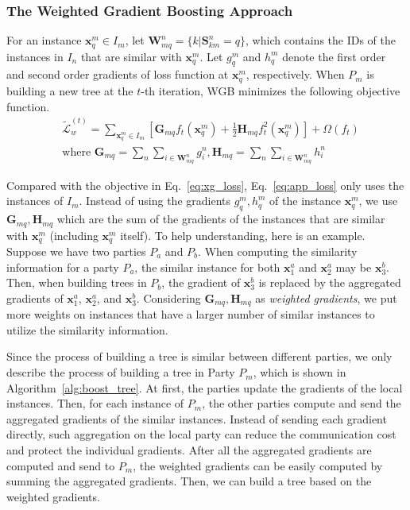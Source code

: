 \documentclass[letterpaper]{article} %
\theoremstyle{definition}
\newcommand{\mtx}[1]{\ensuremath{\mathbf{#1}}}
\begin{document}
\subsubsection{The Weighted Gradient Boosting Approach}
For an instance $\mathbf{x}_q^m\in I_m$, let $\mathbf{W}_{mq}^n=\{k|\mtx{S}_{km}^n=q\}$, which contains the IDs of the instances in $I_n$ that are similar with $\mathbf{x}_q^m$. Let $g_q^m$ and $h_q^m$ denote the first order and second order gradients of loss function at $\mathbf{x}_q^m$, respectively. When $P_m$ is building a new tree at the $t$-th iteration, WGB minimizes the following objective function.
\begin{equation}
\begin{aligned}
    &\mathcal{\tilde{L}}_w^{(t)} = \sum_{\mathbf{x}_q^m\in I_m} [\mathbf{G}_{mq}f_t(\mathbf{x}_q^m)+\frac{1}{2}\mathbf{H}_{mq}f_t^2(\mathbf{x}_q^m)]+\Omega(f_t)\\
    &\text{where } \mathbf{G}_{mq} = \sum_{n}\sum_{i\in \mathbf{W}_{mq}^n}g_i^n, \mathbf{H}_{mq} = \sum_{n}\sum_{i\in \mathbf{W}_{mq}^n}h_i^n
\label{eq:app_loss}
\end{aligned}
\end{equation}

Compared with the objective in Eq.~\eqref{eq:xg_loss}, Eq.~\eqref{eq:app_loss} only uses the instances of $I_m$. Instead of using the gradients $g_q^m, h_q^m$ of the instance $\mathbf{x}_q^m$,  we use $\mathbf{G}_{mq}, \mathbf{H}_{mq}$ which are the sum of the gradients of the instances that are similar with $\mathbf{x}_q^m$ (including $\mathbf{x}_q^m$ itself). To help understanding, here is an example. Suppose we have two parties $P_a$ and $P_b$. When computing the similarity information for a party $P_a$, the similar instance for both $\mathbf{x}_1^a$ and $\mathbf{x}_2^a$ may be $\mathbf{x}_3^b$. Then, when building trees in $P_b$, the gradient of $\mathbf{x}_3^b$ is replaced by the aggregated gradients of $\mathbf{x}_1^a$, $\mathbf{x}_2^a$, and $\mathbf{x}_3^b$. Considering $\mathbf{G}_{mq}, \mathbf{H}_{mq}$ as \textit{weighted gradients}, we put more weights on instances that have a larger number of similar instances to utilize the similarity information.

Since the process of building a tree is similar between different parties, we only describe the process of building a tree in Party $P_m$, which is shown in Algorithm~\ref{alg:boost_tree}. At first, the parties update the gradients of the local instances. Then, for each instance of $P_m$, the other parties compute and send the aggregated gradients of the similar instances. Instead of sending each gradient directly, such aggregation on the local party can reduce the communication cost and protect the individual gradients. After all the aggregated gradients are computed and send to $P_m$, the weighted gradients can be easily computed by summing the aggregated gradients. Then, we can build a tree based on the weighted gradients.
\end{document}
